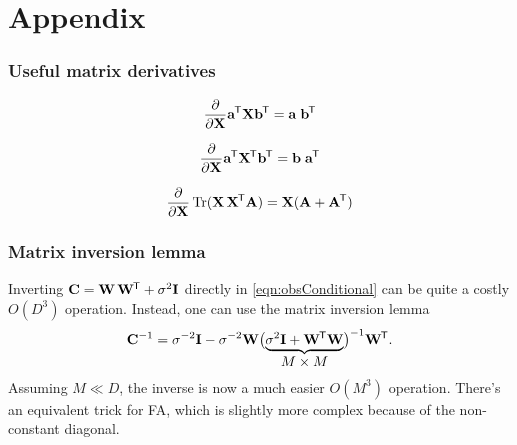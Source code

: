 \documentclass[11pt]{article}
\DeclareMathOperator{\Tr}{Tr}
\newcommand{\Wb}{\mathbf{W}}
\newcommand*{\tran}{^{\mkern-1.5mu\mathsf{T}}}
\begin{document}
\section*{Appendix}
\subsubsection*{Useful matrix derivatives}
\begin{equation}
	\begin{split}
	\frac{\partial}{\partial \mathbf{X}} \mathbf{a}\tran \mathbf{X} \mathbf{b} \tran
    &= \mathbf{a}\; \mathbf{b}\tran \\
	\end{split}
\end{equation}

\begin{equation}
	\begin{split}
	\frac{\partial}{\partial \mathbf{X}} \mathbf{a}\tran \mathbf{X}\tran \mathbf{b} \tran
    &= \mathbf{b} \; \mathbf{a}\tran \\
	\end{split}
\end{equation}

\begin{equation}
	\frac{\partial}{\partial \mathbf{X}} \Tr(\mathbf{X} \, \mathbf{X}\tran \mathbf{A}) =
    \mathbf{X}(\mathbf{A} + \mathbf{A}\tran)
\end{equation}

\subsubsection*{Matrix inversion lemma}
Inverting $\mathbf{C} = \Wb\,\Wb\tran + \sigma^2 \mathbf{I}$ directly in
\eqref{eqn:obsConditional} can be quite a costly $O(D^3)$ operation. Instead,
one can use the matrix inversion lemma
\begin{equation*}
  \mathbf{C}^{-1} = \sigma^{-2}\mathbf{I} -
    \sigma^{-2} \Wb \bigl(\underbrace{\sigma^2 \mathbf{I} + \Wb\tran\Wb}_{
    \mathclap{\text{\normalsize $M\times M$}}}\bigr)^{-1} \Wb\tran.
\end{equation*}
Assuming $M \ll D$, the inverse is now a much easier $O(M^3)$ operation. There's
an equivalent trick for FA, which is slightly more complex because of the
non-constant diagonal.
\end{document}
